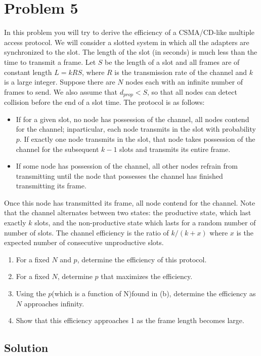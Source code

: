 \section*{Problem 5}

In this problem you will try to derive the efficiency of a CSMA/CD-like multiple access protocol.
We will consider a slotted system in which all the adapters are synchronized to the slot.
The length of the slot (in seconds) is much less than the time to transmit a frame.
Let $S$ be the length of a slot and all frames are of constant length $L=kRS$, where $R$ is the transmission rate of the channel and $k$ is a large integer.
Suppose there are $N$ nodes each with an infinite number of frames to send.
We also assume that $d_{prop} < S$, so that all nodes can detect collision before the end of a slot time.
The protocol is as follows:

\begin{itemize}
    \item If for a given slot, no node has possession of the channel, all nodes contend for the channel; inparticular, each node transmits in the slot with probability $p$.
          If exactly one node transmits in the slot, that node takes possession of the channel for the subsequent $k-1$ slots and transmits its entire frame.
    \item If some node has possession of the channel, all other nodes refrain from transmitting until the node that possesses the channel has finished transmitting its frame.
\end{itemize}

Once this node has transmitted its frame, all node contend for the channel.
Note that the channel alternates between two states: the productive state, which last exactly $k$ slots, and the non-productive state which lasts for a random number of number of slots.
The channel efficiency is the ratio of $k/(k+x)$ where $x$ is the expected number of consecutive unproductive slots.

\begin{enumerate}
    \item For a fixed $N$ and $p$, determine the efficiency of this protocol.
    \item For a fixed $N$, determine $p$ that maximizes the efficiency.
    \item Using the $p$(which is a function of N)found in (b), determine the efficiency as $N$ approaches infinity.
    \item Show that this efficiency approaches 1 as the frame length becomes large.
\end{enumerate}

\subsection*{Solution}
